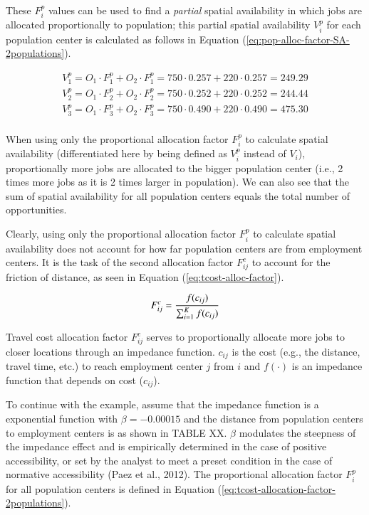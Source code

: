 \documentclass[]{elsarticle} %
\begin{document}
These \(F^p_{i}\) values can be used to find a \emph{partial} spatial
availability in which jobs are allocated proportionally to population;
this partial spatial availability \(V^p_{i}\) for each population center
is calculated as follows in Equation
(\ref{eq:pop-alloc-factor-SA-2populations}).

\begin{equation}
\label{eq:pop-alloc-factor-SA-2populations}
\begin{array}{l}
V^p_{1} = O_1 \cdot F^p_{1} + O_2 \cdot F^p_{1} = 750 \cdot 0.257 + 220 \cdot 0.257 = 249.29 \\
V^p_{2} = O_1 \cdot F^p_{2} + O_2 \cdot F^p_{2} = 750 \cdot 0.252 + 220 \cdot 0.252 = 244.44 \\
V^p_{3} = O_1 \cdot F^p_{3} + O_2 \cdot F^p_{3}= 750 \cdot 0.490 + 220 \cdot 0.490 = 475.30 \\
\end{array}
\end{equation}

When using only the proportional allocation factor \(F^p_{i}\) to
calculate spatial availability (differentiated here by being defined as
\(V^p_{i}\) instead of \(V_{i}\)), proportionally more jobs are
allocated to the bigger population center (i.e., 2 times more jobs as it
is 2 times larger in population). We can also see that the sum of
spatial availability for all population centers equals the total number
of opportunities.

Clearly, using only the proportional allocation factor \(F^p_{i}\) to
calculate spatial availability does not account for how far population
centers are from employment centers. It is the task of the second
allocation factor \(F^c_{ij}\) to account for the friction of distance,
as seen in Equation (\ref{eq:tcost-alloc-factor}).

\begin{equation}
\label{eq:tcost-alloc-factor}
F^c_{ij} = \frac{f(c_{ij})}{\sum_{i=1}^K f(c_{ij})}\\
\end{equation}

Travel cost allocation factor \(F^c_{ij}\) serves to proportionally
allocate more jobs to closer locations through an impedance function.
\(c_{ij}\) is the cost (e.g., the distance, travel time, etc.) to reach
employment center \(j\) from \(i\) and \(f(\cdot)\) is an impedance
function that depends on cost (\(c_{ij}\)).

To continue with the example, assume that the impedance function is a
exponential function with \(\beta=-0.00015\) and the distance from
population centers to employment centers is as shown in TABLE XX.
\(\beta\) modulates the steepness of the impedance effect and is
empirically determined in the case of positive accessibility, or set by
the analyst to meet a preset condition in the case of normative
accessibility (Paez et al., 2012). The proportional allocation factor
\(F^p_{i}\) for all population centers is defined in Equation
(\ref{eq:tcost-allocation-factor-2populations}).
\end{document}
